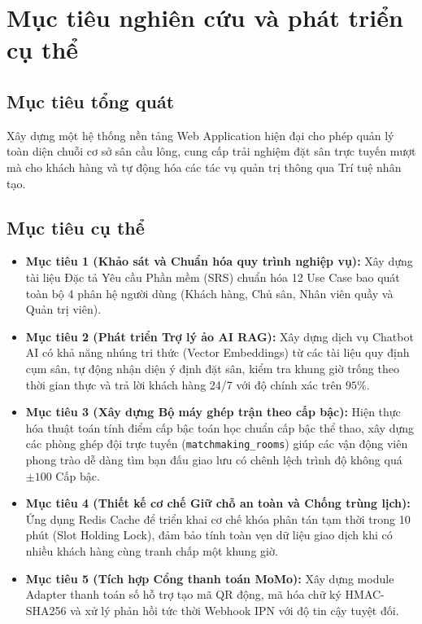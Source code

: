 \section{Mục tiêu nghiên cứu và phát triển cụ thể}
\label{sec:muctieu}

\subsection{Mục tiêu tổng quát}
Xây dựng một hệ thống nền tảng Web Application hiện đại cho phép quản lý toàn diện chuỗi cơ sở sân cầu lông, cung cấp trải nghiệm đặt sân trực tuyến mượt mà cho khách hàng và tự động hóa các tác vụ quản trị thông qua Trí tuệ nhân tạo.

\subsection{Mục tiêu cụ thể}
\begin{itemize}[leftmargin=1.5cm]
    \item \textbf{Mục tiêu 1 (Khảo sát và Chuẩn hóa quy trình nghiệp vụ):} Xây dựng tài liệu Đặc tả Yêu cầu Phần mềm (SRS) chuẩn hóa 12 Use Case bao quát toàn bộ 4 phân hệ người dùng (Khách hàng, Chủ sân, Nhân viên quầy và Quản trị viên).
    \item \textbf{Mục tiêu 2 (Phát triển Trợ lý ảo AI RAG):} Xây dựng dịch vụ Chatbot AI có khả năng nhúng tri thức (Vector Embeddings) từ các tài liệu quy định cụm sân, tự động nhận diện ý định đặt sân, kiểm tra khung giờ trống theo thời gian thực và trả lời khách hàng 24/7 với độ chính xác trên $95\%$.
    \item \textbf{Mục tiêu 3 (Xây dựng Bộ máy ghép trận theo cấp bậc):} Hiện thực hóa thuật toán tính điểm cấp bậc toán học chuẩn cấp bậc thể thao, xây dựng các phòng ghép đội trực tuyến (\texttt{matchmaking\_rooms}) giúp các vận động viên phong trào dễ dàng tìm bạn đấu giao lưu có chênh lệch trình độ không quá $\pm 100$ Cấp bậc.
    \item \textbf{Mục tiêu 4 (Thiết kế cơ chế Giữ chỗ an toàn và Chống trùng lịch):} Ứng dụng Redis Cache để triển khai cơ chế khóa phân tán tạm thời trong 10 phút (Slot Holding Lock), đảm bảo tính toàn vẹn dữ liệu giao dịch khi có nhiều khách hàng cùng tranh chấp một khung giờ.
    \item \textbf{Mục tiêu 5 (Tích hợp Cổng thanh toán MoMo):} Xây dựng module Adapter thanh toán số hỗ trợ tạo mã QR động, mã hóa chữ ký HMAC-SHA256 và xử lý phản hồi tức thời Webhook IPN với độ tin cậy tuyệt đối.
\end{itemize}


